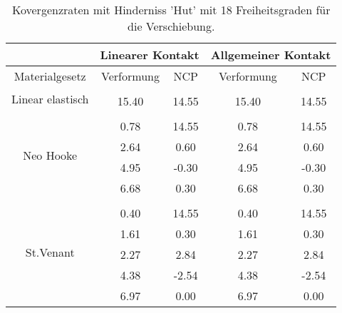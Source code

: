 \begin{table} 
\centering 
\begin{tabular}{c|cc|cc|} 
\cline{2-5} 
 & \multicolumn{2}{|c|}{Linearer Kontakt} & \multicolumn{2}{|c|}{Allgemeiner Kontakt} \\ 
\hline 
\multicolumn{1}{|c|}{Materialgesetz} & \multicolumn{1}{c|}{Verformung} & \multicolumn{1}{c|}{NCP} & \multicolumn{1}{c|}{Verformung} & \multicolumn{1}{c|}{NCP} \\ 
\hline 
\multicolumn{1}{|c|}{\multirow{2}{*}{Linear elastisch}} &\multicolumn{1}{|c|}{} & \multicolumn{1}{|c|}{} & \multicolumn{1}{|c|}{} & \multicolumn{1}{|c|}{} \\ 
\multicolumn{1}{|c|}{} & \multicolumn{1}{|c|}{     15.40} & \multicolumn{1}{|c|}{     14.55} & \multicolumn{1}{|c|}{     15.40} & \multicolumn{1}{|c|}{     14.55} \\ 
\hline 
\multicolumn{1}{|c|}{\multirow{5}{*}{Neo Hooke}} &\multicolumn{1}{|c|}{} & \multicolumn{1}{|c|}{} & \multicolumn{1}{|c|}{} & \multicolumn{1}{|c|}{} \\ 
\multicolumn{1}{|c|}{} & \multicolumn{1}{|c|}{      0.78} & \multicolumn{1}{|c|}{     14.55} & \multicolumn{1}{|c|}{      0.78} & \multicolumn{1}{|c|}{     14.55} \\ 
\multicolumn{1}{|c|}{} & \multicolumn{1}{|c|}{      2.64} & \multicolumn{1}{|c|}{      0.60} & \multicolumn{1}{|c|}{      2.64} & \multicolumn{1}{|c|}{      0.60} \\ 
\multicolumn{1}{|c|}{} & \multicolumn{1}{|c|}{      4.95} & \multicolumn{1}{|c|}{     -0.30} & \multicolumn{1}{|c|}{      4.95} & \multicolumn{1}{|c|}{     -0.30} \\ 
\multicolumn{1}{|c|}{} & \multicolumn{1}{|c|}{      6.68} & \multicolumn{1}{|c|}{      0.30} & \multicolumn{1}{|c|}{      6.68} & \multicolumn{1}{|c|}{      0.30} \\ 
\hline 
\multicolumn{1}{|c|}{\multirow{6}{*}{St.Venant}} &\multicolumn{1}{|c|}{} & \multicolumn{1}{|c|}{} & \multicolumn{1}{|c|}{} & \multicolumn{1}{|c|}{} \\ 
\multicolumn{1}{|c|}{} & \multicolumn{1}{|c|}{      0.40} & \multicolumn{1}{|c|}{     14.55} & \multicolumn{1}{|c|}{      0.40} & \multicolumn{1}{|c|}{     14.55} \\ 
\multicolumn{1}{|c|}{} & \multicolumn{1}{|c|}{      1.61} & \multicolumn{1}{|c|}{      0.30} & \multicolumn{1}{|c|}{      1.61} & \multicolumn{1}{|c|}{      0.30} \\ 
\multicolumn{1}{|c|}{} & \multicolumn{1}{|c|}{      2.27} & \multicolumn{1}{|c|}{      2.84} & \multicolumn{1}{|c|}{      2.27} & \multicolumn{1}{|c|}{      2.84} \\ 
\multicolumn{1}{|c|}{} & \multicolumn{1}{|c|}{      4.38} & \multicolumn{1}{|c|}{     -2.54} & \multicolumn{1}{|c|}{      4.38} & \multicolumn{1}{|c|}{     -2.54} \\ 
\multicolumn{1}{|c|}{} & \multicolumn{1}{|c|}{      6.97} & \multicolumn{1}{|c|}{      0.00} & \multicolumn{1}{|c|}{      6.97} & \multicolumn{1}{|c|}{      0.00} \\ 
\hline 
\end{tabular}\caption{Kovergenzraten mit Hinderniss 'Hut' mit 18 Freiheitsgraden für die Verschiebung.}\label{tab:Rate_Hut_level0}
\end{table} 

